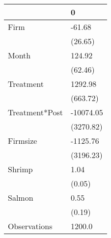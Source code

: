 \begin{tabular}{ll}
\toprule
{} &          0 \\
\midrule
Firm           &     -61.68 \\
               &    (26.65) \\
Month          &     124.92 \\
               &    (62.46) \\
Treatment      &    1292.98 \\
               &   (663.72) \\
Treatment*Post &  -10074.05 \\
               &  (3270.82) \\
Firmsize       &   -1125.76 \\
               &  (3196.23) \\
Shrimp         &       1.04 \\
               &     (0.05) \\
Salmon         &       0.55 \\
               &     (0.19) \\
Observations   &     1200.0 \\
\bottomrule
\end{tabular}
